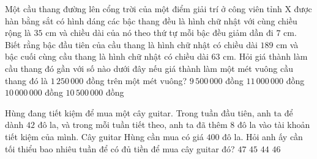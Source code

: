 \begin{ex}%
	Một cầu thang đường lên cổng trời của một điểm giải trí ở công viên tỉnh X được hàn bằng sắt có  hình dáng các bậc thang đều là hình chữ nhật với cùng chiều rộng là $35$ cm và chiều dài của nó theo thứ tự mỗi bậc đều giảm dần đi $7$ cm. Biết rằng bậc đầu tiên của cầu thang là hình chữ nhật có chiều dài $189$ cm và bậc cuối cùng cầu thang là hình chữ nhật có chiều dài $63$ cm. Hỏi giá thành làm cầu thang đó gần với số nào dưới đây nếu giá thành làm một mét vuông cầu thang đó là $1\,250\,000$ đồng trên một mét vuông?
	\choice 
		 {$9\,500\,000$ đồng}
		{$11\,000\,000$  đồng}
		{$10\,000\,000$  đồng}
		{\True $10\,500\,000$ đồng} 
\end{ex}


\begin{ex}%
	Hùng đang tiết kiệm để mua một cây guitar. Trong tuần đầu tiên, anh ta để dành $42$ đô la, và trong mỗi tuần tiết theo, anh ta đã thêm $8$ đô  la vào tài khoản tiết kiệm của mình. Cây guitar Hùng cần mua có giá $400$ đô la. Hỏi anh ấy cần tối thiểu bao nhiêu tuần để có đủ tiền để mua cây guitar đó?
	 \choiceTF
		 {$47$}
		 {$45$}
		 {$44$}
		{\True  $46$}
\end{ex}

